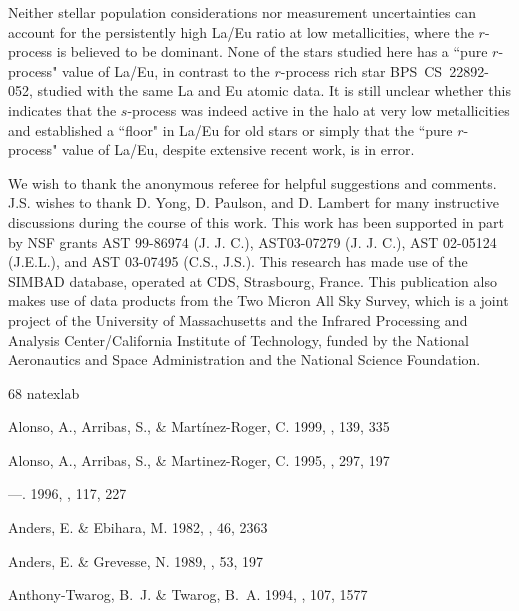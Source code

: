 \documentclass[12pt,preprint]{aastex}
\def\cs22{\mbox{BPS CS 22892-052}}
\begin{document}
{Neither stellar population considerations nor measurement  uncertainties can account for the persistently high La/Eu ratio at low metallicities, where the $r$-process is believed to be dominant.  None  of the stars studied here has a ``pure $r$-process" value of La/Eu,  in contrast to the $r$-process rich star \cs22, studied with the same La and Eu atomic data.  It is still unclear whether this indicates  that the $s$-process was indeed active in the halo at very low metallicities and established a ``floor" in La/Eu for old stars or simply that the ``pure $r$-process" value of La/Eu, despite extensive recent work, is in error.

\acknowledgments
We wish to thank the anonymous referee for helpful suggestions and comments.  J.S. wishes to thank D. Yong, D. Paulson, and D. Lambert for many instructive discussions during the course of this work.
This work has been supported in part by NSF grants AST 99-86974 (J. J. C.), AST03-07279 (J. J. C.),  AST 02-05124 (J.E.L.), and AST 03-07495 (C.S., J.S.).  This research has made use of the SIMBAD database, operated at CDS, Strasbourg, France.  This publication also makes use of data products from the Two Micron All Sky Survey, which is a joint project of the University of Massachusetts and the Infrared Processing and Analysis Center/California Institute of Technology, funded by the National Aeronautics and Space Administration and the National Science Foundation.  

\newpage
%
\begin{thebibliography}{68}
\expandafter\ifx\csname natexlab\endcsname\relax\def\natexlab#1{#1}\fi

{Alonso}, A., {Arribas}, S., \& {Mart{\' i}nez-Roger}, C. 1999, \aaps, 139, 335

{Alonso}, A., {Arribas}, S., \& {Martinez-Roger}, C. 1995, \aap, 297, 197

---. 1996, \aaps, 117, 227

{Anders}, E. \& {Ebihara}, M. 1982, \gca, 46, 2363

{Anders}, E. \& {Grevesse}, N. 1989, \gca, 53, 197

{Anthony-Twarog}, B.~J. \& {Twarog}, B.~A. 1994, \aj, 107, 1577


\end{thebibliography}}
\end{document}
